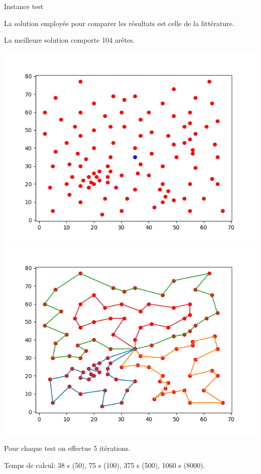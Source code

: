 \documentclass{beamer}
\begin{document}
\begin{frame}{Instance test}

La solution employée pour comparer les résultats est celle de la littérature.

La meilleure solution comporte 104 arêtes.

\includegraphics[scale=0.3]{Instance10104.png}
\includegraphics[scale=0.3]{Solution10104.png}

Pour chaque test on effectue 5 itérations.

Temps de calcul: 38 s (50), 75 s (100), 375 s (500), 1060 s (8000). 
\end{frame}
\end{document}
